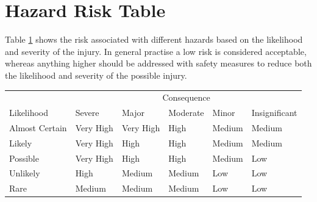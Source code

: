 \documentclass[]{report}
\begin{document}
\section{Hazard Risk Table}
Table \ref{RiskMatrixTable} shows the risk associated with different hazards based on the likelihood and severity of the injury. In general practise a low risk is considered acceptable, whereas anything higher should be addressed with safety measures to reduce both the likelihood and severity of the possible injury.

\begin{table}[h]
	\begin{tabular}{|l|lllll}
		\hline
		& \multicolumn{5}{c|}{Consequence}                                                                                                                                                                                                                           \\ \cline{2-6}
		\multirow{-2}{*}{Likelihood} & \multicolumn{1}{l|}{\cellcolor[HTML]{FFFFFF}Severe} & \multicolumn{1}{l|}{\cellcolor[HTML]{FFFFFF}Major} & \multicolumn{1}{l|}{\cellcolor[HTML]{FFFFFF}Moderate} & \multicolumn{1}{l|}{\cellcolor[HTML]{FFFFFF}Minor} & \multicolumn{1}{l|}{Insignificant} \\ \hline
		Almost Certain               & \cellcolor[HTML]{FE0000}Very High                   & \cellcolor[HTML]{FE0000}Very High                  & \cellcolor[HTML]{F56B00}High                          & \cellcolor[HTML]{F8FF00}Medium                     & \cellcolor[HTML]{F8FF00}Medium     \\ \cline{1-1}
		Likely                       & \cellcolor[HTML]{FE0000}Very High                   & \cellcolor[HTML]{F56B00}High                       & \cellcolor[HTML]{F56B00}High                          & \cellcolor[HTML]{F8FF00}Medium                     & \cellcolor[HTML]{F8FF00}Medium     \\ \cline{1-1}
		Possible                     & \cellcolor[HTML]{FE0000}Very High                   & \cellcolor[HTML]{F56B00}High                       & \cellcolor[HTML]{F56B00}High                          & \cellcolor[HTML]{FCFF2F}Medium                     & \cellcolor[HTML]{32CB00}Low        \\ \cline{1-1}
		Unlikely                     & \cellcolor[HTML]{F56B00}High                        & \cellcolor[HTML]{F8FF00}Medium                     & \cellcolor[HTML]{F8FF00}Medium                        & \cellcolor[HTML]{32CB00}Low                        & \cellcolor[HTML]{32CB00}Low        \\ \cline{1-1}
		Rare                         & \cellcolor[HTML]{F8FF00}Medium                      & \cellcolor[HTML]{F8FF00}Medium                     & \cellcolor[HTML]{F8FF00}Medium                        & \cellcolor[HTML]{32CB00}Low                        & \cellcolor[HTML]{32CB00}Low        \\ \cline{1-1}
	\end{tabular}
	\label{RiskMatrixTable}
\end{table}
\end{document}
